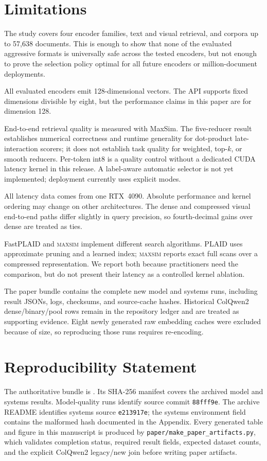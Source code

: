 \documentclass{article}
\newcommand{\sysname}{\textsc{maxsim}}
\begin{document}
\section{Limitations}

The study covers four encoder families, text and visual retrieval, and
corpora up to 57,638 documents. This is enough to show that none of the
evaluated aggressive formats is universally safe across the tested encoders,
but not enough to prove the selection policy optimal for all future encoders
or million-document deployments.

All evaluated encoders emit 128-dimensional vectors. The API supports fixed
dimensions divisible by eight, but the performance claims in this paper are
for dimension 128.

End-to-end retrieval quality is measured with MaxSim. The five-reducer result
establishes numerical correctness and runtime generality for dot-product
late-interaction scorers; it does not establish task quality for weighted,
top-$k$, or smooth reducers. Per-token int8 is a quality control without a
dedicated CUDA latency kernel in this release. A label-aware automatic
selector is not yet implemented; deployment currently uses explicit modes.

All latency data comes from one RTX~4090. Absolute performance and kernel
ordering may change on other architectures. The dense and compressed visual
end-to-end paths differ slightly in query precision, so fourth-decimal gains
over dense are treated as ties.

FastPLAID and \sysname{} implement different search algorithms. PLAID uses
approximate pruning and a learned index; \sysname{} reports exact full scans
over a compressed representation. We report both because practitioners need
the comparison, but do not present their latency as a controlled kernel
ablation.

The paper bundle contains the complete new model and systems runs, including
result JSONs, logs, checksums, and source-cache hashes. Historical ColQwen2
dense/binary/pool rows remain in the repository ledger and are treated as
supporting evidence. Eight newly generated raw embedding caches were excluded
because of size, so reproducing those runs requires re-encoding.

\section*{Reproducibility Statement}

The authoritative bundle is
. Its SHA-256 manifest covers the
archived model and systems results. Model-quality runs identify source commit
\texttt{88fff9e}. The archive README identifies systems source
\texttt{e213917e}; the systems environment field contains the malformed hash
documented in the Appendix. Every generated table and figure in this
manuscript is produced by \texttt{paper/make\_paper\_artifacts.py}, which
validates completion status, required result fields, expected dataset counts,
and the explicit ColQwen2 legacy/new join before writing paper artifacts.
\end{document}
